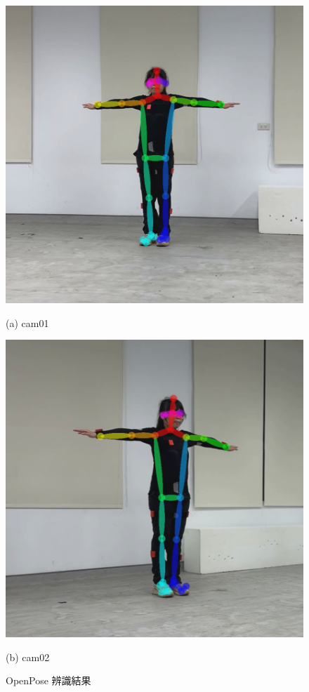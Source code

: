 \begin{figure}[!ht]
   \centering
   \begin{minipage}{.5\textwidth}
     \centering
     \includegraphics[width=.95\linewidth]{figure/ch3_fig_OpenPose_result_cam01.png}
     \caption*{(a) cam01}
   \end{minipage}%
   \begin{minipage}{.5\textwidth}
      \centering
      \includegraphics[width=.95\linewidth]{figure/ch3_fig_OpenPose_result_cam02.png}
      \caption*{(b) cam02}
   \end{minipage}
   \caption[OpenPose 辨識結果]{OpenPose 辨識結果}
   \label{ch3_fig_OpenPose_result}
\end{figure}

